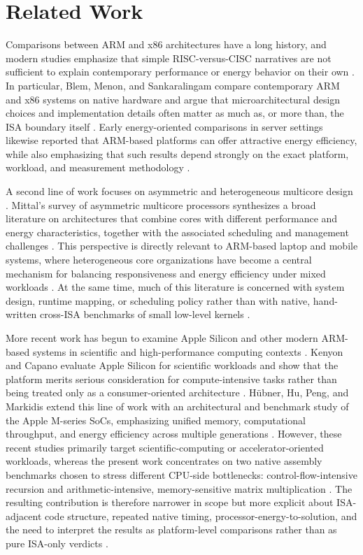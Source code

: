 \documentclass{tcsa}
\begin{document}
\section{Related Work}

Comparisons between ARM and x86 architectures have a long history, and modern studies emphasize that simple RISC-versus-CISC narratives are not sufficient to explain contemporary performance or energy behavior on their own \cite{blem2013,blem_2013_arm_x86,aroca2012}. In particular, Blem, Menon, and Sankaralingam compare contemporary ARM and x86 systems on native hardware and argue that microarchitectural design choices and implementation details often matter as much as, or more than, the ISA boundary itself \cite{blem2013}. Early energy-oriented comparisons in server settings likewise reported that ARM-based platforms can offer attractive energy efficiency, while also emphasizing that such results depend strongly on the exact platform, workload, and measurement methodology \cite{aroca2012}.

A second line of work focuses on asymmetric and heterogeneous multicore design \cite{mittal2016}. Mittal's survey of asymmetric multicore processors synthesizes a broad literature on architectures that combine cores with different performance and energy characteristics, together with the associated scheduling and management challenges \cite{mittal2016}. This perspective is directly relevant to ARM-based laptop and mobile systems, where heterogeneous core organizations have become a central mechanism for balancing responsiveness and energy efficiency under mixed workloads \cite{mittal2016,hubner2025}. At the same time, much of this literature is concerned with system design, runtime mapping, or scheduling policy rather than with native, hand-written cross-ISA benchmarks of small low-level kernels \cite{mittal2016}.

More recent work has begun to examine Apple Silicon and other modern ARM-based systems in scientific and high-performance computing contexts \cite{kenyon2022,hubner2025,apple_vs_oranges}. Kenyon and Capano evaluate Apple Silicon for scientific workloads and show that the platform merits serious consideration for compute-intensive tasks rather than being treated only as a consumer-oriented architecture \cite{kenyon2022}. H\"ubner, Hu, Peng, and Markidis extend this line of work with an architectural and benchmark study of the Apple M-series SoCs, emphasizing unified memory, computational throughput, and energy efficiency across multiple generations \cite{hubner2025,apple_vs_oranges}. However, these recent studies primarily target scientific-computing or accelerator-oriented workloads, whereas the present work concentrates on two native assembly benchmarks chosen to stress different CPU-side bottlenecks: control-flow-intensive recursion and arithmetic-intensive, memory-sensitive matrix multiplication \cite{kenyon2022,hubner2025}. The resulting contribution is therefore narrower in scope but more explicit about ISA-adjacent code structure, repeated native timing, processor-energy-to-solution, and the need to interpret the results as platform-level comparisons rather than as pure ISA-only verdicts \cite{blem2013,aroca2012,hubner2025}.
\end{document}
